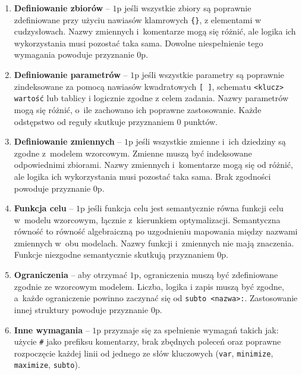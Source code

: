 \begin{enumerate}
\item \textbf{Definiowanie zbiorów} -- $1$p jeśli wszystkie zbiory są poprawnie zdefiniowane przy użyciu nawiasów klamrowych \texttt{\{\}}, z elementami w cudzysłowach. Nazwy zmiennych i~komentarze mogą się różnić, ale logika ich wykorzystania musi pozostać taka sama. Dowolne niespełnienie tego wymagania powoduje przyznanie $0$p. %
\item \textbf{Definiowanie parametrów} -- $1$p jeśli wszystkie parametry są poprawnie zindeksowane za pomocą nawiasów kwadratowych \texttt{[ ]}, schematu \texttt{<klucz> wartość} lub tablicy i logicznie zgodne z celem zadania. Nazwy parametrów mogą się różnić, o~ile zachowano ich poprawne zastosowanie. Każde odstępstwo od reguły skutkuje przyznaniem $0$ punktów.
\item \textbf{Definiowanie zmiennych} -- $1$p jeśli wszystkie zmienne i~ich dziedziny są zgodne z~modelem wzorcowym. Zmienne muszą być indeksowane odpowiednimi zbiorami. Nazwy zmiennych i~komentarze mogą się od różnić, ale logika ich wykorzystania musi pozostać taka sama. Brak zgodności powoduje przyznanie $0$p.
\item \textbf{Funkcja celu} -- $1$p jeśli funkcja celu jest semantycznie równa funkcji celu w~modelu wzorcowym, łącznie z~kierunkiem optymalizacji. Semantyczna równość to równość algebraiczną po uzgodnieniu mapowania między nazwami zmiennych w~obu modelach. Nazwy funkcji i~zmiennych nie mają znaczenia. Funkcje niezgodne semantycznie skutkują przyznaniem $0$p.
\item \textbf{Ograniczenia} -- aby otrzymać $1$p, ograniczenia muszą być zdefiniowane zgodnie ze wzorcowym modelem. Liczba, logika i zapis muszą być zgodne, a~każde ograniczenie powinno zaczynać się od \texttt{subto <nazwa>:}. Zastosowanie innej struktury powoduje przyznanie $0$p.
\item \textbf{Inne wymagania} -- $1$p przyznaje się za spełnienie wymagań takich jak: użycie \texttt{\#} jako prefiksu komentarzy, brak zbędnych poleceń oraz poprawne rozpoczęcie każdej linii od jednego ze słów kluczowych (\texttt{var}, \texttt{minimize}, \texttt{maximize}, \texttt{subto}). 
\end{enumerate}


